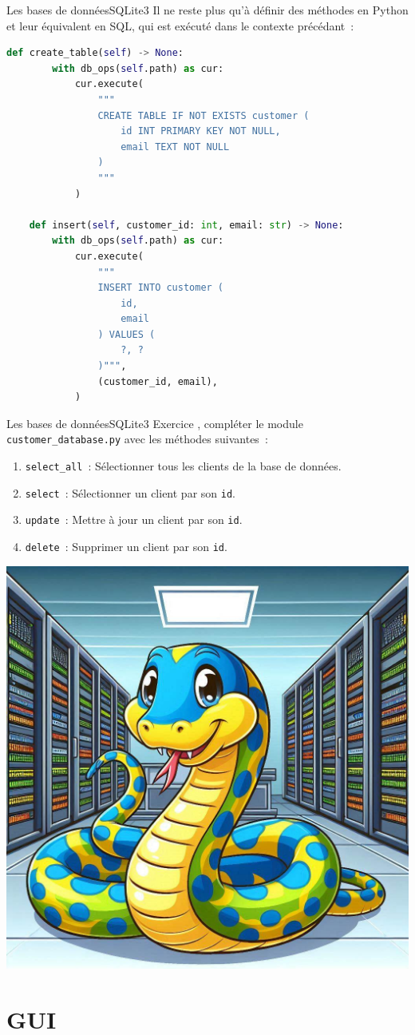 \documentclass{beamer}
\begin{document}
    \begin{frame}[fragile]{Les bases de données}{SQLite3}
        Il ne reste plus qu'à définir des méthodes en Python et leur équivalent en SQL, qui est exécuté dans le contexte précédant~:
        \begin{lstlisting}[language=Python,basicstyle=\tiny\ttfamily]
    def create_table(self) -> None:
        with db_ops(self.path) as cur:
            cur.execute(
                """
                CREATE TABLE IF NOT EXISTS customer (
                    id INT PRIMARY KEY NOT NULL,
                    email TEXT NOT NULL
                )
                """
            )

    def insert(self, customer_id: int, email: str) -> None:
        with db_ops(self.path) as cur:
            cur.execute(
                """
                INSERT INTO customer (
                    id,
                    email
                ) VALUES (
                    ?, ?
                )""",
                (customer_id, email),
            )
        \end{lstlisting}
    \end{frame}

    \begin{frame}{Les bases de données}{SQLite3}
        Exercice \execcounterdispinc{}, compléter le module \lstinline{customer_database.py} avec les méthodes suivantes{}~:
        \begin{enumerate}
            \item \lstinline{select_all}~: Sélectionner tous les clients de la base de données.
            \item \lstinline{select}~: Sélectionner un client par son \lstinline{id}.
            \item \lstinline{update}~: Mettre à jour un client par son \lstinline{id}.
            \item \lstinline{delete}~: Supprimer un client par son \lstinline{id}.
        \end{enumerate}
        \bigbreak
        \centering
        \includegraphics[width=cm]{image/python-in-dc}
    \end{frame}


    \section{GUI}\label{sec:ui}
\end{document}
